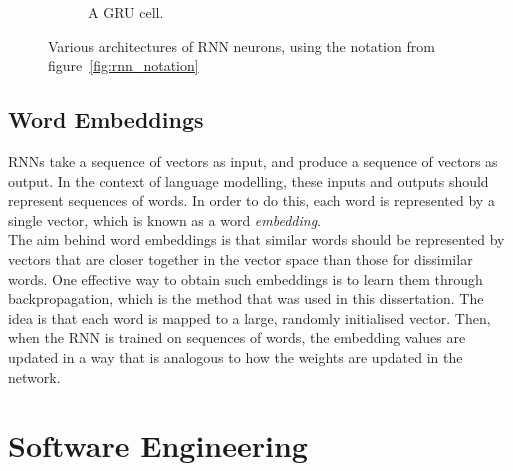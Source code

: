 \documentclass[a4paper, 12pt]{report}
\newcommand{\tit}[1]{\textit{#1}}
\begin{document}
\begin{figure}[h]
\begin{subfigure}{0.33\linewidth}
{}
	\caption{A GRU cell.}
\end{subfigure}
\caption{Various architectures of RNN neurons, using the notation from figure~\ref{fig:rnn_notation}}
\end{figure}

\subsection{Word Embeddings} \label{word_embeddings}

RNNs take a sequence of vectors as input, and produce a sequence of vectors as output. In the context of language modelling, these inputs and outputs should represent sequences of words. In order to do this, each word is represented by a single vector, which is known as a word \tit{embedding}. \\

The aim behind word embeddings is that similar words should be represented by vectors that are closer together in the vector space than those for dissimilar words. One effective way to obtain such embeddings is to learn them through backpropagation, which is the method that was used in this dissertation. The idea is that each word is mapped to a large, randomly initialised vector. Then, when the RNN is trained on sequences of words, the embedding values are updated in a way that is analogous to how the weights are updated in the network.

\section{Software Engineering}
\end{document}
